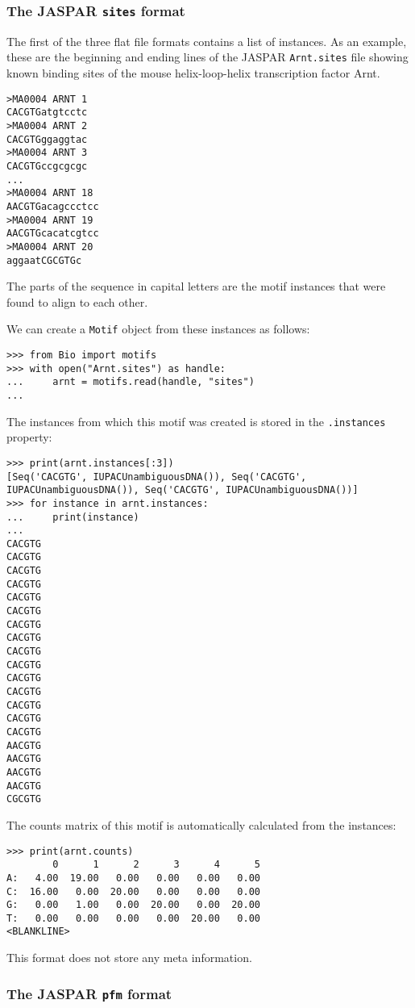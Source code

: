 \documentclass{report}
\begin{document}
\subsubsection*{The JASPAR \texttt{sites} format}

The first of the three flat file formats contains a list of instances. As an example, these are the beginning and ending lines of the JASPAR \verb+Arnt.sites+ file showing known binding sites of the mouse helix-loop-helix transcription factor Arnt.
\begin{verbatim}
>MA0004 ARNT 1
CACGTGatgtcctc
>MA0004 ARNT 2
CACGTGggaggtac
>MA0004 ARNT 3
CACGTGccgcgcgc
...
>MA0004 ARNT 18
AACGTGacagccctcc
>MA0004 ARNT 19
AACGTGcacatcgtcc
>MA0004 ARNT 20
aggaatCGCGTGc
\end{verbatim}
The parts of the sequence in capital letters are the motif instances that were found to align to each other.

We can create a \verb+Motif+ object from these instances as follows:
\begin{verbatim}
>>> from Bio import motifs
>>> with open("Arnt.sites") as handle:
...     arnt = motifs.read(handle, "sites")
...
\end{verbatim}
The instances from which this motif was created is stored in the \verb+.instances+ property:
\begin{verbatim}
>>> print(arnt.instances[:3])
[Seq('CACGTG', IUPACUnambiguousDNA()), Seq('CACGTG', IUPACUnambiguousDNA()), Seq('CACGTG', IUPACUnambiguousDNA())]
>>> for instance in arnt.instances:
...     print(instance)
...
CACGTG
CACGTG
CACGTG
CACGTG
CACGTG
CACGTG
CACGTG
CACGTG
CACGTG
CACGTG
CACGTG
CACGTG
CACGTG
CACGTG
CACGTG
AACGTG
AACGTG
AACGTG
AACGTG
CGCGTG
\end{verbatim}
The counts matrix of this motif is automatically calculated from the instances:
\begin{verbatim}
>>> print(arnt.counts)
        0      1      2      3      4      5
A:   4.00  19.00   0.00   0.00   0.00   0.00
C:  16.00   0.00  20.00   0.00   0.00   0.00
G:   0.00   1.00   0.00  20.00   0.00  20.00
T:   0.00   0.00   0.00   0.00  20.00   0.00
<BLANKLINE>
\end{verbatim}
This format does not store any meta information.

\subsubsection*{The JASPAR \texttt{pfm} format}
\end{document}
